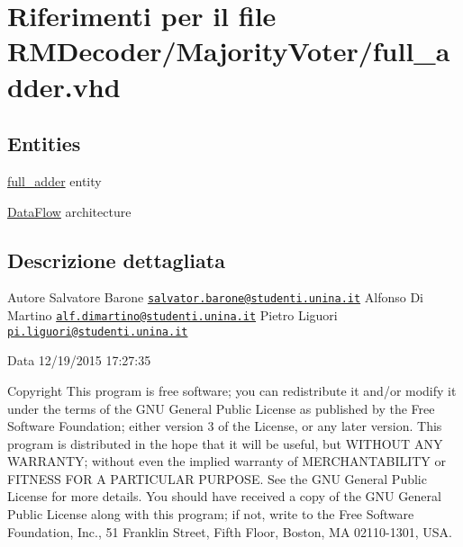\hypertarget{full__adder_8vhd}{\section{Riferimenti per il file R\+M\+Decoder/\+Majority\+Voter/full\+\_\+adder.vhd}
\label{full__adder_8vhd}
}
\subsection*{Entities}
\begin{DoxyCompactItemize}
\item 
\hyperlink{classfull__adder}{full\+\_\+adder} entity
\item 
\hyperlink{classfull__adder_1_1_data_flow}{Data\+Flow} architecture
\end{DoxyCompactItemize}


\subsection{Descrizione dettagliata}
\begin{DoxyAuthor}{Autore}
Salvatore Barone \href{mailto:salvator.barone@studenti.unina.it}{\tt salvator.\+barone@studenti.\+unina.\+it} Alfonso Di Martino \href{mailto:alf.dimartino@studenti.unina.it}{\tt alf.\+dimartino@studenti.\+unina.\+it} Pietro Liguori \href{mailto:pi.liguori@studenti.unina.it}{\tt pi.\+liguori@studenti.\+unina.\+it} 
\end{DoxyAuthor}
\begin{DoxyDate}{Data}
12/19/2015 17\+:27\+:35
\end{DoxyDate}
\begin{DoxyCopyright}{Copyright}
This program is free software; you can redistribute it and/or modify it under the terms of the G\+N\+U General Public License as published by the Free Software Foundation; either version 3 of the License, or any later version. This program is distributed in the hope that it will be useful, but W\+I\+T\+H\+O\+U\+T A\+N\+Y W\+A\+R\+R\+A\+N\+T\+Y; without even the implied warranty of M\+E\+R\+C\+H\+A\+N\+T\+A\+B\+I\+L\+I\+T\+Y or F\+I\+T\+N\+E\+S\+S F\+O\+R A P\+A\+R\+T\+I\+C\+U\+L\+A\+R P\+U\+R\+P\+O\+S\+E. See the G\+N\+U General Public License for more details. You should have received a copy of the G\+N\+U General Public License along with this program; if not, write to the Free Software Foundation, Inc., 51 Franklin Street, Fifth Floor, Boston, M\+A 02110-\/1301, U\+S\+A. 
\end{DoxyCopyright}
